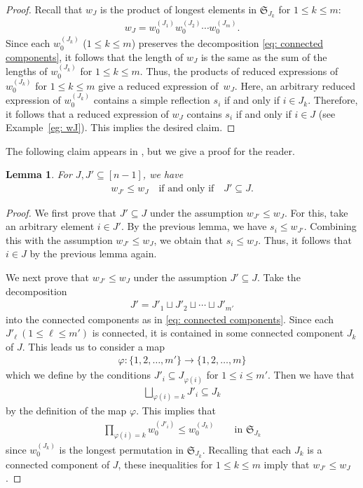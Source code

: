\documentclass[11pt]{article}
\newtheorem{lemma}[theo]{Lemma}
\theoremstyle{definition}
\numberwithin{equation}{section}
\numberwithin{equation}{section}
\begin{document}
\begin{proof}
Recall that $w_J$ is the product of longest elements in $\mathfrak{S}_{J_k}$ for $1\le k\le m$:
\begin{align*}
 w_J = w_0^{(J_1)} w_0^{(J_2)} \cdots w_0^{(J_{m})}.
\end{align*}
Since each $w_0^{(J_k)}$ ($1\le k\le m$) preserves the decomposition \eqref{eq: connected components}, it follows that the length of $w_J$ is the same as the sum of the lengths of $w_0^{(J_k)}$ for $1\le k\le m$. Thus, the products of reduced expressions of $w_0^{(J_k)}$ for $1\le k\le m$ give a reduced expression of~$w_J$. Here, an arbitrary reduced expression of $w_0^{(J_k)}$ contains a simple reflection $s_i$ if and only if $i\in J_k$. Therefore, it follows that a reduced expression of $w_J$ contains $s_i$ if and only if $i\in J$ (see Example~\ref{eg: wJ}). This implies the desired claim. 
\end{proof}

The following claim appears in \cite[Lemma 6]{Insko-Tymoczko}, but we give a proof for the reader.
\begin{lemma}\label{lem: So-san's lemma}
For $J,J'\subseteq[n-1]$, we have
\begin{align}\label{eq: subavr 15}
w_{J'} \le w_{J} \quad \text{if and only if} \quad J'\subseteq J .
\end{align}
\end{lemma}

\begin{proof}
We first prove that $J'\subseteq J$ under the assumption $w_{J'} \le w_{J}$. For this, take an arbitrary element $i\in J'$. By the previous lemma, we have $s_i\le w_{J'}$. Combining this with the assumption $w_{J'} \le w_{J}$, we obtain that $s_i\le w_{J}$. Thus, it follows that $i\in J$ by the previous lemma again. 

We next prove that $w_{J'} \le w_{J}$ under the assumption $J'\subseteq J$. Take the decomposition 
\begin{align*}
 J' = J'_1 \sqcup J'_2 \sqcup \cdots \sqcup J'_{m'}
\end{align*}
into the connected components as in \eqref{eq: connected components}. Since each $J'_{\ell}\ (1\le \ell \le m')$ is connected, it is contained in some connected component $J_k$ of $J$. This leads us to consider a map
\begin{align*}
 \varphi \colon \{1,2,\ldots,m'\} \rightarrow \{1,2,\ldots,m\}
\end{align*}
which we define by the conditions $J'_i\subseteq J_{\varphi(i)}$ for $1\le i\le m'$. Then we have that
\begin{align*}
 \bigsqcup_{\varphi(i)=k} J'_i \subseteq J_{k}
\end{align*}
by the definition of the map $\varphi$. This implies that 
\begin{align*}
 \prod_{\varphi(i)=k} w_0^{(J'_i)} \le w_0^{(J_k)}
 \qquad \text{in $\mathfrak{S}_{J_k}$}
\end{align*}
since $w_0^{(J_k)}$ is the longest permutation in $\mathfrak{S}_{J_k}$. Recalling that each $J_k$ is a connected component of $J$, these inequalities for $1\le k\le m$ imply that $w_{J'}\le w_{J}$.
\end{proof}
\end{document}
